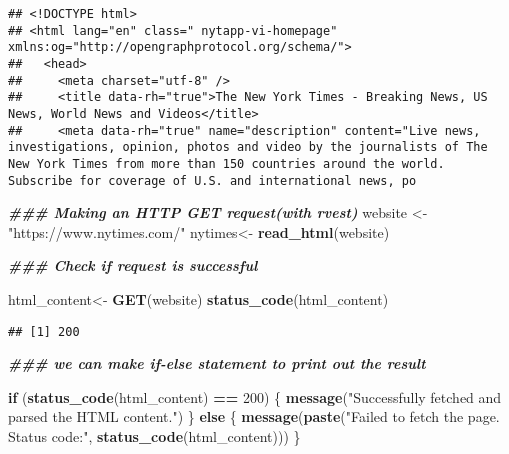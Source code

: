 \documentclass[
]{article}
\newenvironment{Shaded}{\begin{snugshade}}{\end{snugshade}}
\newcommand{\ControlFlowTok}[1]{\textcolor[rgb]{0.13,0.29,0.53}{\textbf{#1}}}
\newcommand{\DecValTok}[1]{\textcolor[rgb]{0.00,0.00,0.81}{#1}}
\newcommand{\DocumentationTok}[1]{\textcolor[rgb]{0.56,0.35,0.01}{\textbf{\textit{#1}}}}
\newcommand{\FunctionTok}[1]{\textcolor[rgb]{0.13,0.29,0.53}{\textbf{#1}}}
\newcommand{\NormalTok}[1]{#1}
\newcommand{\OtherTok}[1]{\textcolor[rgb]{0.56,0.35,0.01}{#1}}
\newcommand{\SpecialCharTok}[1]{\textcolor[rgb]{0.81,0.36,0.00}{\textbf{#1}}}
\newcommand{\StringTok}[1]{\textcolor[rgb]{0.31,0.60,0.02}{#1}}
\begin{document}
\begin{verbatim}
## <!DOCTYPE html>
## <html lang="en" class=" nytapp-vi-homepage"  xmlns:og="http://opengraphprotocol.org/schema/">
##   <head>
##     <meta charset="utf-8" />
##     <title data-rh="true">The New York Times - Breaking News, US News, World News and Videos</title>
##     <meta data-rh="true" name="description" content="Live news, investigations, opinion, photos and video by the journalists of The New York Times from more than 150 countries around the world. Subscribe for coverage of U.S. and international news, po
\end{verbatim}

\begin{Shaded}
\begin{Highlighting}[]
\DocumentationTok{\#\#\# Making an HTTP GET request(with rvest)}
\NormalTok{website }\OtherTok{\textless{}{-}} \StringTok{"https://www.nytimes.com/"}
\NormalTok{nytimes}\OtherTok{\textless{}{-}} \FunctionTok{read\_html}\NormalTok{(website)}
\end{Highlighting}
\end{Shaded}

\begin{Shaded}
\begin{Highlighting}[]
\DocumentationTok{\#\#\# Check if request is successful }

\NormalTok{html\_content}\OtherTok{\textless{}{-}} \FunctionTok{GET}\NormalTok{(website)}
\FunctionTok{status\_code}\NormalTok{(html\_content)}
\end{Highlighting}
\end{Shaded}

\begin{verbatim}
## [1] 200
\end{verbatim}

\begin{Shaded}
\begin{Highlighting}[]
\DocumentationTok{\#\#\# we can make if{-}else statement to print out the result}

\ControlFlowTok{if}\NormalTok{ (}\FunctionTok{status\_code}\NormalTok{(html\_content) }\SpecialCharTok{==} \DecValTok{200}\NormalTok{) \{}
  \FunctionTok{message}\NormalTok{(}\StringTok{"Successfully fetched and parsed the HTML content."}\NormalTok{)}
\NormalTok{\} }\ControlFlowTok{else}\NormalTok{ \{}
  \FunctionTok{message}\NormalTok{(}\FunctionTok{paste}\NormalTok{(}\StringTok{"Failed to fetch the page. Status code:"}\NormalTok{, }\FunctionTok{status\_code}\NormalTok{(html\_content)))}
\NormalTok{\}}
\end{Highlighting}
\end{Shaded}
\end{document}
